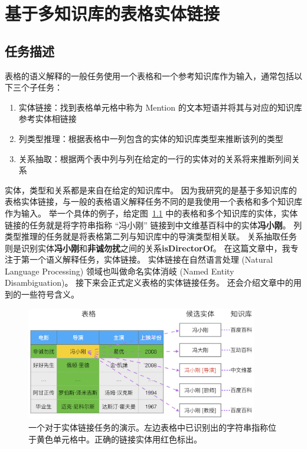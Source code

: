 \chapter{基于多知识库的表格实体链接}

\section{任务描述}\label{task}

表格的语义解释的一般任务使用一个表格和一个参考知识库作为输入，通常包括以下三个子任务：

\begin{enumerate}[1.]
\item 实体链接：找到表格单元格中称为 Mention 的文本短语并将其与对应的知识库参考实体相链接
\item 列类型推理：根据表格中一列包含的实体的知识库类型来推断该列的类型
\item 关系抽取：根据两个表中列与列在给定的一行的实体对的关系将来推断列间关系
\end{enumerate}

实体，类型和关系都是来自在给定的知识库中。
因为我研究的是基于多知识库的表格实体链接，与一般的表格语义解释任务不同的是我使用一个表格和多个知识库作为输入。
举一个具体的例子，给定图~\ref{el} 中的表格和多个知识库的实体，实体链接的任务就是将字符串指称 ``冯小刚'' 链接到中文维基百科中的实体\textbf{冯小刚}。
列类型推理的任务就是将表格第二列与知识库中的导演类型相关联。
关系抽取任务则是识别实体\textbf{冯小刚}和\textbf{非诚勿扰}之间的关系\textbf{isDirectorOf}。
在这篇文章中，我专注于第一个语义解释任务，实体链接。
实体链接在自然语言处理 (Natural Language Processing) 领域也叫做命名实体消岐 (Named Entity Disambiguation)。
接下来会正式定义表格的实体链接任务。
还会介绍文章中的用到的一些符号含义。\newline\par

\begin{figure}[htbp]
\centering
\includegraphics[width=0.9\textwidth]{img/el}
\caption{一个对于实体链接任务的演示。左边表格中已识别出的字符串指称位于黄色单元格中。正确的链接实体用红色标出。}
\label{el}
\end{figure}

